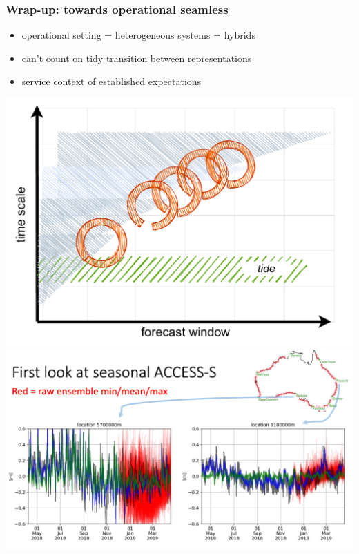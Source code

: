\begin{frame}
\frametitle{Wrap-up: towards operational seamless}
\begin{itemize}
    \item operational setting = heterogeneous systems = hybrids
    \item can't count on tidy transition between representations
    \item service context of established expectations
\end{itemize}
\vfill{}
\includegraphics[height=0.4\textheight]{figures/diagrams/scales_with_broken_chain.pdf}
\includegraphics[height=0.4\textheight]{figures/plots/placeholder_accessS_timeseries.png}
\end{frame}